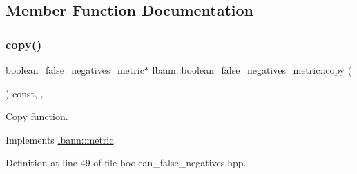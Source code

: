 \subsection{Member Function Documentation}
\mbox{\label{classlbann_1_1boolean__false__negatives__metric_abd0e7a6040232d5b6d8b10e79a3208c1}} 
\subsubsection{\texorpdfstring{copy()}{copy()}}
{\footnotesize\ttfamily \hyperlink{classlbann_1_1boolean__false__negatives__metric}{boolean\+\_\+false\+\_\+negatives\+\_\+metric}$\ast$ lbann\+::boolean\+\_\+false\+\_\+negatives\+\_\+metric\+::copy (\begin{DoxyParamCaption}{ }\end{DoxyParamCaption}) const\hspace{0.3cm}{\ttfamily [inline]}, {\ttfamily [override]}, {\ttfamily [virtual]}}

Copy function. 

Implements \hyperlink{classlbann_1_1metric_a2a4498d41f77da8585552f485caab167}{lbann\+::metric}.



Definition at line 49 of file boolean\+\_\+false\+\_\+negatives.\+hpp.


